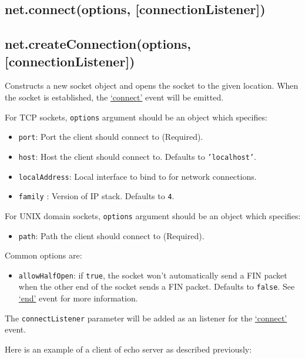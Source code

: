 \subsection{net.connect(options, {[}connectionListener{]})}

\subsection{net.createConnection(options, {[}connectionListener{]})}

Constructs a new socket object and opens the socket to the given
location. When the socket is established, the
\hyperref[net_event_connect]{`connect'} event will be emitted.

For TCP sockets, \texttt{options} argument should be an object which
specifies:

\begin{itemize}
\item
  \texttt{port}: Port the client should connect to (Required).
\item
  \texttt{host}: Host the client should connect to. Defaults to
  \texttt{'localhost'}.
\item
  \texttt{localAddress}: Local interface to bind to for network
  connections.
\item
  \texttt{family} : Version of IP stack. Defaults to \texttt{4}.
\end{itemize}

For UNIX domain sockets, \texttt{options} argument should be an object
which specifies:

\begin{itemize}
\item
  \texttt{path}: Path the client should connect to (Required).
\end{itemize}

Common options are:

\begin{itemize}
\item
  \texttt{allowHalfOpen}: if \texttt{true}, the socket won't
  automatically send a FIN packet when the other end of the socket sends
  a FIN packet. Defaults to \texttt{false}. See
  \hyperref[net_event_end]{`end'} event for more information.
\end{itemize}

The \texttt{connectListener} parameter will be added as an listener for
the \hyperref[net_event_connect]{`connect'} event.

Here is an example of a client of echo server as described previously:

